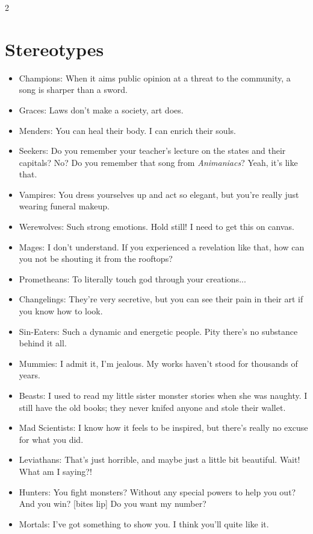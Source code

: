 \begin{multicols}{2}
\section*{Stereotypes}
\begin{itemize}
\item Champions: When it aims public opinion at a threat to the community, a song is sharper than a sword.
\item Graces: Laws don't make a society, art does.
\item Menders: You can heal their body. I can enrich their souls.
\item Seekers: Do you remember your teacher's lecture on the states and their capitals? No? Do you remember that song from \textit{Animaniacs}? Yeah, it's like that.
 
\item Vampires: You dress yourselves up and act so elegant, but you're really just wearing funeral makeup.
\item Werewolves: Such strong emotions. Hold still! I need to get this on canvas. 
\item Mages: I don't understand. If you experienced a revelation like that, how can you not be shouting it from the rooftops? 
\item Prometheans: To literally touch god through your creations...
\item Changelings: They're very secretive, but you can see their pain in their art if you know how to look.
\item Sin-Eaters: Such a dynamic and energetic people. Pity there's no substance behind it all.
\item Mummies: I admit it, I'm jealous. My works haven't stood for thousands of years. 
\item Beasts: I used to read my little sister monster stories when she was naughty. I still have the old books; they never knifed anyone and stole their wallet.


\item Mad Scientists: I know how it feels to be inspired, but there's really no excuse for what you did.
\item Leviathans: That's just horrible, and maybe just a little bit beautiful. Wait! What am I saying?!

\item Hunters: You fight monsters? Without any special powers to help you out? And you win? [bites lip] Do you want my number?
\item Mortals: I've got something to show you. I think you'll quite like it. 
\end{itemize}


\end{multicols}

